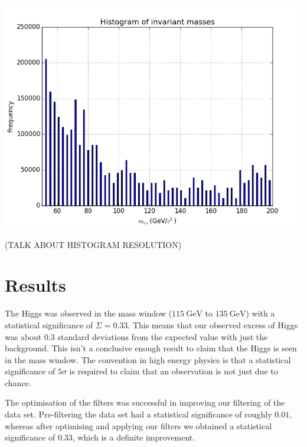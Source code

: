 \documentclass[11pt]{amsart}
\newenvironment{Figure}
  {\par\medskip\noindent\minipage{\linewidth}}
  {\endminipage\par\medskip}
\begin{document}
\begin{multicols}{2}
\begin{Figure}
  \centering
  \includegraphics[width=\linewidth]{invmass2}
  \label{fig:invmass}
\end{Figure}

(TALK ABOUT HISTOGRAM RESOLUTION)

\section{Results}

The Higgs was observed in the mass window ($\SI{115}{\giga\electronvolt}$ to $\SI{135}{\giga\electronvolt}$) with a statistical significance of $\Sigma = 0.33$. This means that our observed excess of Higgs was about 0.3 standard deviations from the expected value with just the background. This isn't a conclusive enough result to claim that the Higgs is seen in the mass window. The convention in high energy physics is that a statistical significance of $5 \sigma$ is required to claim that an observation is not just due to chance. \cite{5sigma}

The optimisation of the filters was successful in improving our filtering of the data set. Pre-filtering the data set had a statistical significance of roughly $0.01$, whereas after optimising and applying our filters we obtained a statistical significance of $0.33$, which is a definite improvement.


\end{multicols}
\end{document}
